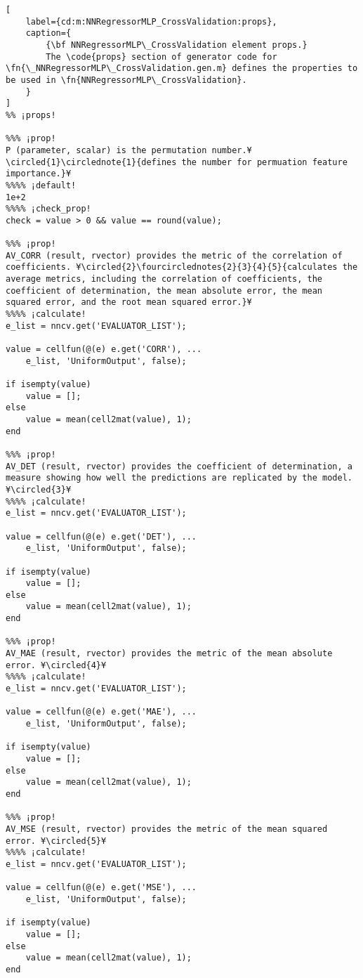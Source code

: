 \documentclass{tufte-handout}
\begin{document}
\begin{lstlisting}[
	label={cd:m:NNRegressorMLP_CrossValidation:props},
	caption={
		{\bf NNRegressorMLP\_CrossValidation element props.}
		The \code{props} section of generator code for \fn{\_NNRegressorMLP\_CrossValidation.gen.m} defines the properties to be used in \fn{NNRegressorMLP\_CrossValidation}.
	}
]
%% ¡props!

%%% ¡prop!
P (parameter, scalar) is the permutation number.¥\circled{1}\circlednote{1}{defines the number for permuation feature importance.}¥
%%%% ¡default!
1e+2
%%%% ¡check_prop!
check = value > 0 && value == round(value);

%%% ¡prop!
AV_CORR (result, rvector) provides the metric of the correlation of coefficients. ¥\circled{2}\fourcirclednotes{2}{3}{4}{5}{calculates the average metrics, including the correlation of coefficients, the coefficient of determination, the mean absolute error, the mean squared error, and the root mean squared error.}¥
%%%% ¡calculate!
e_list = nncv.get('EVALUATOR_LIST');

value = cellfun(@(e) e.get('CORR'), ...
    e_list, 'UniformOutput', false);

if isempty(value)
    value = [];
else
    value = mean(cell2mat(value), 1);
end

%%% ¡prop!
AV_DET (result, rvector) provides the coefficient of determination, a measure showing how well the predictions are replicated by the model. ¥\circled{3}¥
%%%% ¡calculate!
e_list = nncv.get('EVALUATOR_LIST');

value = cellfun(@(e) e.get('DET'), ...
    e_list, 'UniformOutput', false);

if isempty(value)
    value = [];
else
    value = mean(cell2mat(value), 1);
end

%%% ¡prop!
AV_MAE (result, rvector) provides the metric of the mean absolute error. ¥\circled{4}¥
%%%% ¡calculate!
e_list = nncv.get('EVALUATOR_LIST');

value = cellfun(@(e) e.get('MAE'), ...
    e_list, 'UniformOutput', false);

if isempty(value)
    value = [];
else
    value = mean(cell2mat(value), 1);
end

%%% ¡prop!
AV_MSE (result, rvector) provides the metric of the mean squared error. ¥\circled{5}¥
%%%% ¡calculate!
e_list = nncv.get('EVALUATOR_LIST');

value = cellfun(@(e) e.get('MSE'), ...
    e_list, 'UniformOutput', false);

if isempty(value)
    value = [];
else
    value = mean(cell2mat(value), 1);
end


\end{lstlisting}
\end{document}
